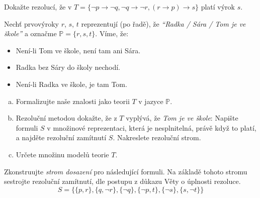 \documentclass[a4paper,11pt]{amsart}
\begin{document}
\begin{problem}

    Dokažte rezolucí, že v $T=\{\neg p \to \neg q,\neg q \to \neg r, (r\to p)\to s\}$ platí výrok $s$.

    \begin{solution}
                    
    \end{solution}

\end{problem}


\begin{problem}
    
    Nechť prvovýroky $r$, $s$, $t$  reprezentují (po řadě), že \emph{``Radka / Sára / Tom je ve škole''} a označme $\mathbb{P}=\{r,s,t\}$. Víme, že:
    \begin{itemize}\it
        \item Není-li Tom ve škole, není tam ani Sára.
        \item Radka bez Sáry do školy nechodí.
        \item Není-li Radka ve škole, je tam Tom.
    \end{itemize}
    \begin{enumerate}[(a)]
        \item Formalizujte naše znalosti jako teorii $T$ v jazyce $\mathbb P$.
        \item Rezoluční metodou dokažte, že z $T$ vyplývá, že \emph{Tom je ve škole}: Napište formuli $S$ v množinové reprezentaci, která je nesplnitelná, právě když to platí, a najděte rezoluční zamítnutí $S$. Nakreslete rezoluční strom.
        \item Určete množinu modelů teorie $T$.
    \end{enumerate}

    \begin{solution}
                    
    \end{solution}

\end{problem}


\begin{problem}
        
    Zkonstruujte \emph{strom dosazení} pro následující formuli. Na základě tohoto stromu sestrojte rezoluční zamítnutí, dle postupu z důkazu Věty o úplnosti rezoluce.
    $$
    S=\{\{p,r\},\{q,\neg r\},\{\neg q\},\{\neg p,t\},\{\neg s\},\{s,\neg t\}\}
    $$

    \begin{solution}
                    
    \end{solution}
    
\end{problem}
        
\end{document}
